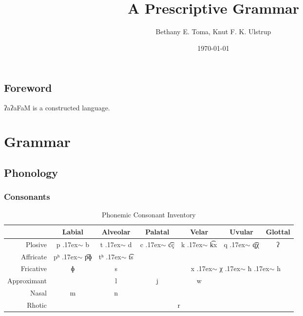 \documentclass[a4paper,10pt,twoside,openright,draft]{memoir}
\title{{\fontsize{80}{80}\selectfont \lang} \\ \Huge \sffamily A Prescriptive Grammar}
\author{Bethany E. Toma, Knut F. K. Ulstrup}
\date{\today}
\newcommand{\lang}{ʔaʔaFaM}
\newcommand{\ttilde}{\raise.17ex\hbox{$\scriptstyle\sim$}}
\begin{document}
\pagecolor{Melon}
\maketitle
\pagecolor{white}

\frontmatter

\chapter{Foreword}

\lang{} is a constructed language.

\newpage

\tableofcontents

\mainmatter

\part{Grammar}

\chapter{Phonology}
\section{Consonants}

\begin{table}[ht]
    \centering
    \begin{tabular}{rcccccc}
    \toprule
            & Labial & Alveolar & Palatal & Velar & Uvular & Glottal \\
    \midrule
    Plosive & p \ttilde{} b & t \ttilde{} d & \multirow{2}{*}{c \ttilde{} \t{cç}} & \multirow{2}{*}{k \ttilde{} \t{kx}} & \multirow{2}{*}{q \ttilde{} \t{qχ}} & ʔ \\
    Affricate & pʰ \ttilde{} \t{pɸ} & tʰ \ttilde{} \t{ts} & & & & \\
    Fricative & ɸ & s & & \multicolumn{3}{c}{x \hspace{1ex} \ttilde{} \hspace{1ex} χ \hspace{1ex} \ttilde{} \hspace{1ex} ħ \hspace{1ex} \ttilde{} \hspace{1ex} h} \\
    Approximant & & l & j & w & & \\
    Nasal & m & n & & & & \\
    Rhotic & & \multicolumn{4}{c}{r} & \\
    \bottomrule
    \end{tabular}
    \caption{Phonemic Consonant Inventory}
    \label{tab:consinv}
\end{table}
\end{document}
